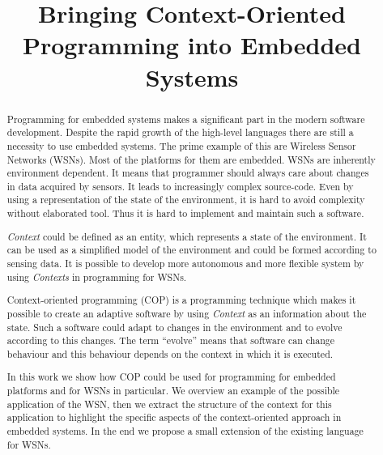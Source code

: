 \documentclass{ubicomp-ext}
\title{Bringing Context-Oriented Programming into Embedded Systems}
\author{
  \vspace{-1.5em} %
  \alignauthor{
  	\textbf{First Author}\\
  	\affaddr{AuthorCo, Inc.}\\
  	\affaddr{123 Author Ave.}\\
  	\affaddr{Authortown, PA 54321 USA}\\
  	\email{author1@anotherco.com}
  }\alignauthor{
  	\textbf{Fifth Author}\\
  	\affaddr{AuthorCo, Inc.}\\
  	\affaddr{123 Author Ave.}\\
  	\affaddr{Authortown, PA 54321 USA}\\
  	\email{author5@anotherco.com}
  }
  \vfil
}
\begin{document}
\maketitle

\begin{abstract}
Programming for embedded systems makes a significant part in the modern software development. Despite the rapid growth of the high-level languages there are still a necessity to use embedded systems. The prime example of this are Wireless Sensor Networks (WSNs). Most of the platforms for them are embedded.  WSNs are inherently environment dependent. It  means that programmer should always care about changes in data acquired by sensors. It leads to increasingly complex source-code. Even by using a representation of the state of the environment, it is hard to avoid complexity without elaborated tool. Thus it is hard to implement and maintain such a software.

\textit{Context} could be defined as an entity, which represents a state of the environment. It can be used as a simplified model of the environment and could be formed according to sensing data. It is possible to develop more autonomous and more flexible system by using \textit{Contexts} in programming for WSNs.

Context-oriented programming (COP) is a programming technique which makes it possible to create an adaptive software by using \textit{Context} as an information about the state. Such a software could adapt to changes in the environment and to evolve according to this changes. The term ``evolve'' means that software can change behaviour and this behaviour depends on the context in which it is executed.

In this work we show how COP could be used for programming for embedded platforms and for WSNs in particular. We overview an example of the possible application of the WSN, then we extract the structure of the context for this application to highlight the specific aspects of the context-oriented approach in embedded systems. In the end we propose a small extension of the existing language for WSNs.
\end{abstract}
\end{document}
